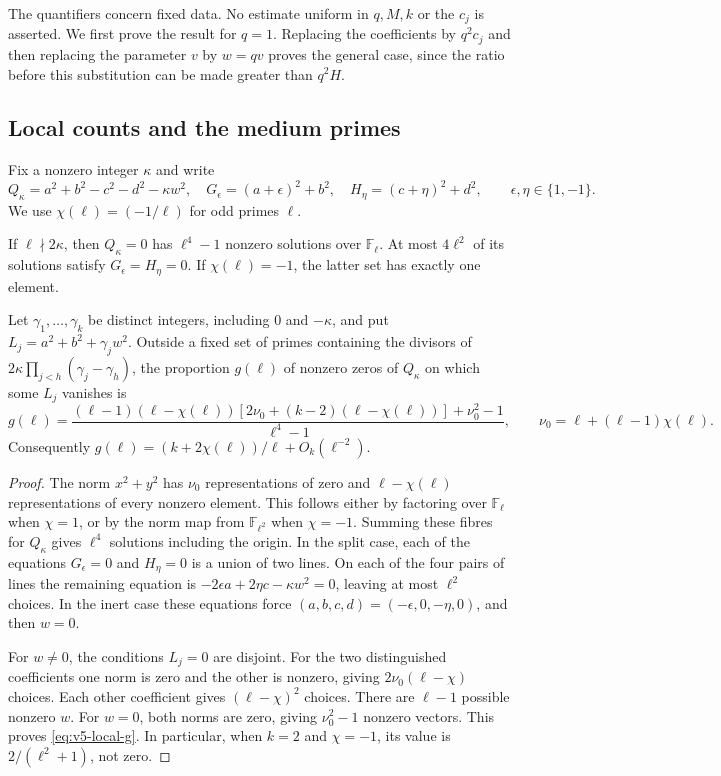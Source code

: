 The quantifiers concern fixed data. No estimate uniform in $q,M,k$ or the
$c_j$ is asserted. We first prove the result for $q=1$. Replacing the
coefficients by $q^2c_j$ and then replacing the parameter $v$ by $w=qv$
proves the general case, since the ratio before this substitution can be
made greater than $q^2H$.

\subsection{Local counts and the medium primes}\label{subsec:v5-local-sieve}

Fix a nonzero integer $\kappa$ and write
\[
 Q_\kappa=a^2+b^2-c^2-d^2-\kappa w^2,\quad
 G_\epsilon=(a+\epsilon)^2+b^2,\quad
 H_\eta=(c+\eta)^2+d^2,
 \qquad \epsilon,\eta\in\{1,-1\}.
\]
We use $\chi(\ell)=(-1/\ell)$ for odd primes $\ell$.

\begin{lemma}\label{lem:v5-local-counts}
If $\ell\nmid2\kappa$, then $Q_\kappa=0$ has $\ell^4-1$ nonzero
solutions over $\mathbb F_\ell$. At most $4\ell^2$ of its solutions satisfy
$G_\epsilon=H_\eta=0$. If $\chi(\ell)=-1$, the latter set has exactly one
element.

Let $\gamma_1,\ldots,\gamma_k$ be distinct integers, including $0$ and
$-\kappa$, and put $L_j=a^2+b^2+\gamma_jw^2$. Outside a fixed set of primes
containing the divisors of $2\kappa\prod_{j<h}(\gamma_j-\gamma_h)$, the
proportion $g(\ell)$ of nonzero zeros of $Q_\kappa$ on which some $L_j$
vanishes is
\begin{equation}\label{eq:v5-local-g}
 g(\ell)=
 \frac{(\ell-1)(\ell-\chi(\ell))
 [2\nu_0+(k-2)(\ell-\chi(\ell))]+\nu_0^2-1}{\ell^4-1},
 \qquad \nu_0=\ell+(\ell-1)\chi(\ell).
\end{equation}
Consequently $g(\ell)=(k+2\chi(\ell))/\ell+O_k(\ell^{-2})$.
\end{lemma}
\begin{proof}
The norm $x^2+y^2$ has $\nu_0$ representations of zero and
$\ell-\chi(\ell)$ representations of every nonzero element. This follows
either by factoring over $\mathbb F_\ell$ when $\chi=1$, or by the norm map
from $\mathbb F_{\ell^2}$ when $\chi=-1$. Summing these fibres for
$Q_\kappa$ gives $\ell^4$ solutions including the origin.
In the split case, each of the equations $G_\epsilon=0$ and $H_\eta=0$
is a union of two lines. On each of the four pairs of lines the remaining
equation is
$-2\epsilon a+2\eta c-\kappa w^2=0$, leaving at most $\ell^2$ choices.
In the inert case these equations force
$(a,b,c,d)=(-\epsilon,0,-\eta,0)$, and then $w=0$.

For $w\ne0$, the conditions $L_j=0$ are disjoint. For the two distinguished
coefficients one norm is zero and the other is nonzero, giving
$2\nu_0(\ell-\chi)$ choices. Each other coefficient gives
$(\ell-\chi)^2$ choices. There are $\ell-1$ possible nonzero $w$.
For $w=0$, both norms are zero, giving $\nu_0^2-1$ nonzero vectors.
This proves \eqref{eq:v5-local-g}. In particular, when $k=2$ and
$\chi=-1$, its value is $2/(\ell^2+1)$, not zero.
\end{proof}

